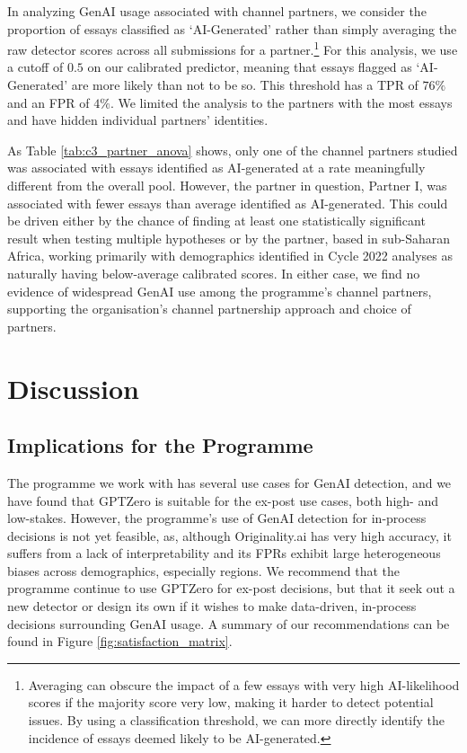 
In analyzing GenAI usage associated with channel partners, we consider the proportion of essays classified as `AI-Generated' rather than simply averaging the raw detector scores across all submissions for a partner.\footnote{Averaging can obscure the impact of a few essays with very high AI-likelihood scores if the majority score very low, making it harder to detect potential issues. By using a classification threshold, we can more directly identify the incidence of essays deemed likely to be AI-generated.} For this analysis, we use a cutoff of $0.5$ on our calibrated predictor, meaning that essays flagged as `AI-Generated' are more likely than not to be so. This threshold has a TPR of $76\%$ and an FPR of $4\%$. We limited the analysis to the partners with the most essays and have hidden individual partners' identities.

As Table \ref{tab:c3_partner_anova} shows, only one of the channel partners studied was associated with essays identified as AI-generated at a rate meaningfully different from the overall pool. However, the partner in question, Partner I, was associated with fewer essays than average identified as AI-generated. This could be driven either by the chance of finding at least one statistically significant result when testing multiple hypotheses or by the partner, based in sub-Saharan Africa, working primarily with demographics identified in Cycle 2022 analyses as naturally having below-average calibrated scores. In either case, we find no evidence of widespread GenAI use among the programme's channel partners, supporting the organisation's channel partnership approach and choice of partners.

\section{Discussion}\label{sec:genaidisc}
\subsection{Implications for the Programme}
The programme we work with has several use cases for GenAI detection, and we have found that GPTZero is suitable for the ex-post use cases, both high- and low-stakes. However, the programme's use of GenAI detection for in-process decisions is not yet feasible, as, although Originality.ai has very high accuracy, it suffers from a lack of interpretability and its FPRs exhibit large heterogeneous biases across demographics, especially regions. We recommend that the programme continue to use GPTZero for ex-post decisions, but that it seek out a new detector or design its own if it wishes to make data-driven, in-process decisions surrounding GenAI usage. A summary of our recommendations can be found in Figure \ref{fig:satisfaction_matrix}.

